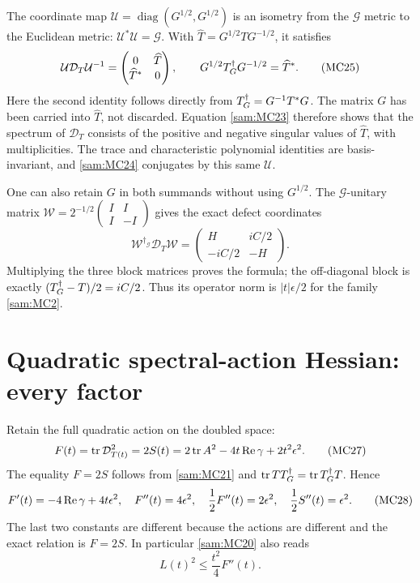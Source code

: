 \documentclass[11pt]{article}
\begin{document}
The coordinate map \(\mathcal U=\operatorname{diag}(G^{1/2},G^{1/2})\)
is an isometry from the \(\mathcal G\) metric to the Euclidean metric:
\(\mathcal U^*\mathcal U=\mathcal G\). With
\(\widehat T=G^{1/2}TG^{-1/2}\), it satisfies
\begin{equation}
 \mathcal U\mathcal D_T\mathcal U^{-1}
  =\begin{pmatrix}0&\widehat T\\\widehat T^*&0\end{pmatrix},
 \qquad
 G^{1/2}T^\dagger_G G^{-1/2}=\widehat T^*.
 \tag{MC25}\label{sam:MC25}
\end{equation}
Here the second identity follows directly from \(T^\dagger_G=G^{-1}T^*G\).
The matrix \(G\) has been carried into \(\widehat T\), not discarded.
Equation \eqref{sam:MC23} therefore shows that the spectrum of
\(\mathcal D_T\) consists of the positive and negative singular values
of \(\widehat T\), with multiplicities. The trace and characteristic
polynomial identities are basis-invariant, and \eqref{sam:MC24} conjugates
by this same \(\mathcal U\).

One can also retain \(G\) in both summands without using \(G^{1/2}\).
The \(\mathcal G\)-unitary matrix
\(\mathcal W=2^{-1/2}\left(\begin{smallmatrix}I&I\\I&-I\end{smallmatrix}\right)\)
gives the exact defect coordinates
\begin{equation}
 \mathcal W^{\dagger_{\mathcal G}}\mathcal D_T\mathcal W
 =\begin{pmatrix}H&iC/2\\-iC/2&-H\end{pmatrix}.
 \tag{MC26}\label{sam:MC26}
\end{equation}
Multiplying the three block matrices proves the formula; the
off-diagonal block is exactly \((T^\dagger_G-T)/2=iC/2\).
Thus its operator norm is \(|t|\epsilon/2\) for the family \eqref{sam:MC2}.

\section{Quadratic spectral-action Hessian: every factor}

Retain the full quadratic action on the doubled space:
\begin{equation}
 F(t)=\operatorname{tr}\mathcal D_{T(t)}^2
      =2S(t)
      =2\operatorname{tr} A^2-4t\operatorname{Re}\gamma+2t^2\epsilon^2.
 \tag{MC27}\label{sam:MC27}
\end{equation}
The equality \(F=2S\) follows from \eqref{sam:MC21} and
\(\operatorname{tr} TT^\dagger_G=\operatorname{tr} T^\dagger_G T\). Hence
\begin{equation}
 F'(t)=-4\operatorname{Re}\gamma+4t\epsilon^2,\quad
 F''(t)=4\epsilon^2,\quad
 \frac12F''(t)=2\epsilon^2,\quad
 \frac12S''(t)=\epsilon^2.
 \tag{MC28}\label{sam:MC28}
\end{equation}
The last two constants are different because the actions are different
and the exact relation is \(F=2S\). In particular \eqref{sam:MC20} also reads
\begin{equation}
 L(t)^2\le\frac{t^2}{4}F''(t).
 \tag{MC29}\label{sam:MC29}
\end{equation}
\end{document}
